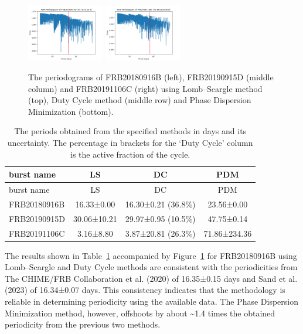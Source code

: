 \documentclass[
  rmp,
  amsmath,
  amssymb,
  preprint]{revtex4-2}
\begin{document}
\begin{figure}
\begin{minipage}[t]{\linewidth}
{\includegraphics[width=0.3\textwidth,height=\textheight]{./img/FRB20190915D-periodogram-PDM.png}
\includegraphics[width=0.3\textwidth,height=\textheight]{./img/FRB20191106C-periodogram-PDM.png}

}

\end{minipage}%

\caption{\label{fig-periodogram}The periodograms of FRB20180916B (left),
FRB20190915D (middle column) and FRB20191106C (right) using
Lomb--Scargle method (top), Duty Cycle method (middle row) and Phase
Dispersion Minimization (bottom).}

\end{figure}

\hypertarget{tbl-result}{}
\begin{longtable}[]{@{}lccc@{}}
\caption{\label{tbl-result}The periods obtained from the specified
methods in days and its uncertainty. The percentage in brackets for the
`Duty Cycle' column is the active fraction of the cycle.}\tabularnewline
\toprule\noalign{}
burst name & LS & DC & PDM \\
\midrule\noalign{}
\endfirsthead
\toprule\noalign{}
burst name & LS & DC & PDM \\
\midrule\noalign{}
\endhead
\bottomrule\noalign{}
\endlastfoot
FRB20180916B & 16.33±0.00 & 16.30±0.21 (36.8\%) & 23.56±0.00 \\
FRB20190915D & 30.06±10.21 & 29.97±0.95 (10.5\%) & 47.75±0.14 \\
FRB20191106C & 3.16±8.80 & 3.87±20.81 (26.3\%) & 71.86±234.36 \\
\end{longtable}

The results shown in Table~\ref{tbl-result} accompanied by
Figure~\ref{fig-periodogram} for FRB20180916B using Lomb--Scargle and
Duty Cycle methods are consistent with the periodicities from The
CHIME/FRB Collaboration et al. (2020) of 16.35±0.15 days and Sand et al.
(2023) of 16.34±0.07 days. This consistency indicates that the
methodology is reliable in determining periodicity using the available
data. The Phase Dispersion Minimization method, however, offshoots by
about \textasciitilde1.4 times the obtained periodicity from the
previous two methods.
\end{document}
